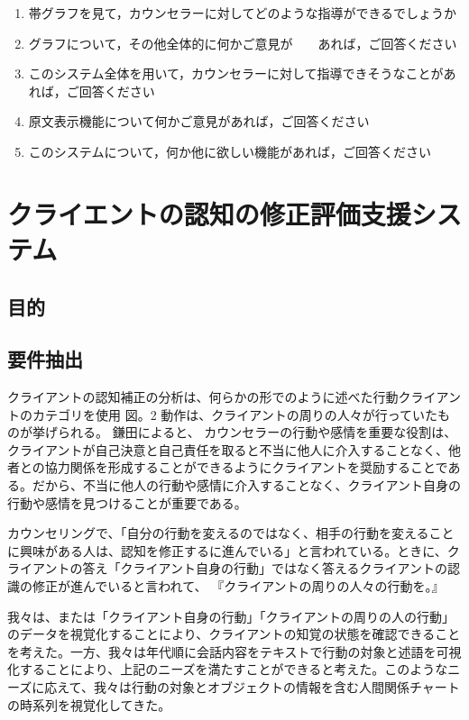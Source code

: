 \documentclass[shuuron]{kuee}
\begin{document}
\begin{enumerate}
 \item 帯グラフを見て，カウンセラーに対してどのような指導ができるでしょうか
 \item グラフについて，その他全体的に何かご意見が　　あれば，ご回答ください
 \item このシステム全体を用いて，カウンセラーに対して指導できそうなことがあれば，ご回答ください
 \item 原文表示機能について何かご意見があれば，ご回答ください
 \item このシステムについて，何か他に欲しい機能があれば，ご回答ください
\end{enumerate}









\chapter{クライエントの認知の修正評価支援システム}
	\section{目的}


\section{要件抽出}

クライアントの認知補正の分析は、何らかの形でのように述べた行動クライアントのカテゴリを使用 図。2 動作は、クライアントの周りの人々が行っていたものが挙げられる。 鎌田によると\cite{kamata2002}、 カウンセラーの行動や感情を重要な役割は、クライアントが自己決意と自己責任を取ると不当に他人に介入することなく、他者との協力関係を形成することができるようにクライアントを奨励することである。だから、不当に他人の行動や感情に介入することなく、クライアント自身の行動や感情を見つけることが重要である。

  カウンセリングで、「自分の行動を変えるのではなく、相手の行動を変えることに興味がある人は、認知を修正するに進んでいる」と言われている。ときに、クライアントの答え「クライアント自身の行動」ではなく答えるクライアントの認識の修正が進んでいると言われて、 『クライアントの周りの人々の行動を。』

  我々は、または「クライアント自身の行動」「クライアントの周りの人の行動」のデータを視覚化することにより、クライアントの知覚の状態を確認できることを考えた。一方、我々は年代順に会話内容をテキストで行動の対象と述語を可視化することにより、上記のニーズを満たすことができると考えた。このようなニーズに応えて、我々は行動の対象とオブジェクトの情報を含む人間関係チャートの時系列を視覚化してきた。
\end{document}
